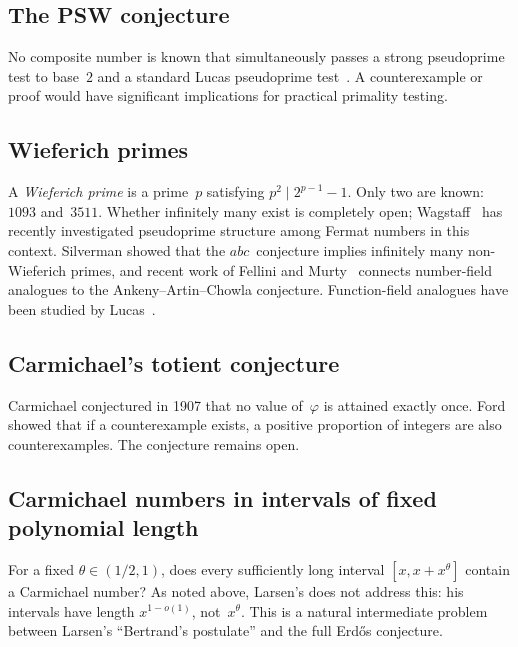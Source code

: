 \documentclass[12pt]{amsart}
\theoremstyle{plain}
\theoremstyle{definition}
\theoremstyle{remark}
\begin{document}
\subsection{The PSW conjecture}\label{subsec:psw}

No composite number is known that simultaneously passes a strong
pseudoprime test to base~$2$ and a standard Lucas pseudoprime
test~\cite{psw1980}.  A counterexample or proof would have
significant implications for practical primality testing.

\subsection{Wieferich primes}\label{subsec:wieferich}

A \emph{Wieferich prime} is a prime~$p$ satisfying $p^{2}\mid
2^{p-1}-1$.  Only two are known: $1093$ and~$3511$.  Whether
infinitely many exist is completely open; Wagstaff~\cite{wagstaff2024}
has recently investigated pseudoprime structure among Fermat numbers
in this context.  Silverman showed that the $abc$~conjecture implies
infinitely many non-Wieferich primes, and recent work of Fellini and
Murty~\cite{fellini_murty2025} connects number-field analogues to the
Ankeny--Artin--Chowla conjecture.  Function-field analogues have been
studied by Lucas~\cite{lucas2025}.

\subsection{Carmichael's totient conjecture}\label{subsec:totient}

Carmichael conjectured in 1907 that no value of~$\varphi$ is attained
exactly once.  Ford showed that if a counterexample exists, a positive
proportion of integers are also counterexamples.  The conjecture
remains open.

\subsection{Carmichael numbers in intervals of fixed polynomial length}
\label{subsec:fixed_theta}

For a fixed $\theta\in(1/2,1)$, does every sufficiently long interval
$[x,x+x^{\theta}]$ contain a Carmichael number?  As noted above,
Larsen's  does not address this: his intervals have
length $x^{1-o(1)}$, not~$x^{\theta}$.  This is a natural
intermediate problem between Larsen's ``Bertrand's postulate'' and the
full Erd\H{o}s conjecture.
\end{document}
